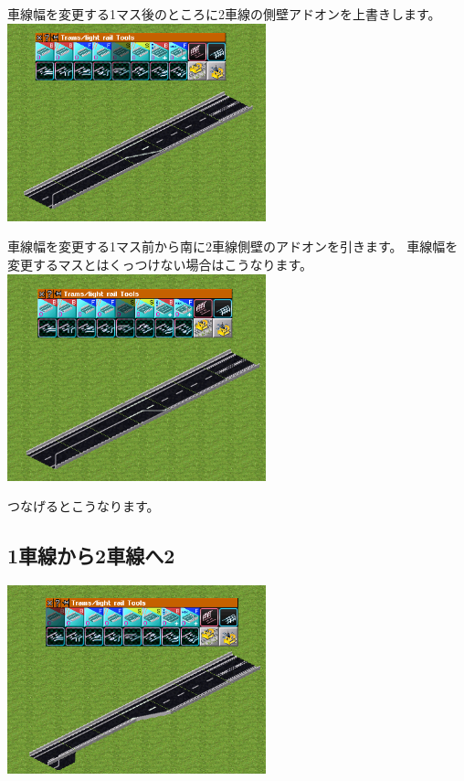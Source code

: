 \documentclass{jbook}
\begin{document}
\begin{multicols}{2}
車線幅を変更する1マス後のところに2車線の側壁アドオンを上書きします。\\


\includegraphics[width = 75mm]{picture/20210214-road-4-6.png}

車線幅を変更する1マス前から南に2車線側壁のアドオンを引きます。
車線幅を変更するマスとはくっつけない場合はこうなります。\\

\includegraphics[width = 75mm]{picture/20210214-road-4-7.png}

つなげるとこうなります。

\end{multicols}

\newpage

\subsection{1車線から2車線へ2}
\label{sub:1lane_to_2lane2}

\includegraphics[width = 75mm]{picture/20210214-road-5-5.png}
\end{document}
